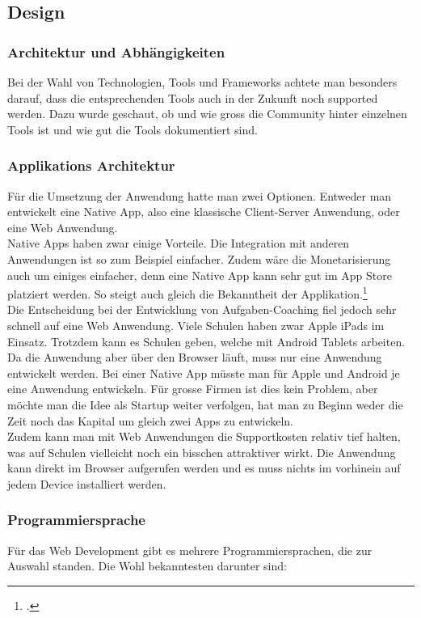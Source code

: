 \subsection{Design}
\subsubsection{Architektur und Abhängigkeiten}
Bei der Wahl von Technologien, Tools und Frameworks achtete man besonders darauf, dass die entsprechenden Tools auch in der Zukunft noch supported werden. Dazu wurde geschaut, ob und wie gross die Community hinter einzelnen Tools ist und wie gut die Tools dokumentiert sind.

\subsubsection*{Applikations Architektur}
Für die Umsetzung der Anwendung hatte man zwei Optionen. Entweder man entwickelt eine Native App, also eine klassische Client-Server Anwendung, oder eine Web Anwendung. \\

Native Apps haben zwar einige Vorteile. Die Integration mit anderen Anwendungen ist so zum Beispiel einfacher. Zudem wäre die Monetarisierung auch um einiges einfacher, denn eine Native App kann sehr gut im App Store platziert werden. So steigt auch gleich die Bekanntheit der Applikation.\footcite{native_app} \\

Die Entscheidung bei der Entwicklung von Aufgaben-Coaching fiel jedoch sehr schnell auf eine Web Anwendung. Viele Schulen haben zwar Apple iPads im Einsatz. Trotzdem kann es Schulen geben, welche mit Android Tablets arbeiten. Da die Anwendung aber über den Browser läuft, muss nur eine Anwendung entwickelt werden. Bei einer Native App müsste man für Apple und Android je eine Anwendung entwickeln. Für grosse Firmen ist dies kein Problem, aber möchte man die Idee als Startup weiter verfolgen, hat man zu Beginn weder die Zeit noch das Kapital um gleich zwei Apps zu entwickeln. \\
Zudem kann man mit Web Anwendungen die Supportkosten relativ tief halten, was auf Schulen vielleicht noch ein bisschen attraktiver wirkt. Die Anwendung kann direkt im Browser aufgerufen werden und es muss nichts im vorhinein auf jedem Device installiert werden.

\subsubsection*{Programmiersprache}
Für das Web Development gibt es mehrere Programmiersprachen, die zur Auswahl standen. Die Wohl bekanntesten darunter sind:

